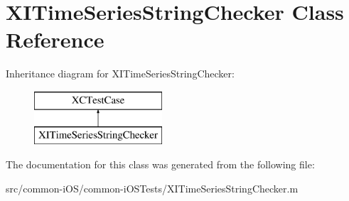 \hypertarget{interface_x_i_time_series_string_checker}{}\section{X\+I\+Time\+Series\+String\+Checker Class Reference}
\label{interface_x_i_time_series_string_checker}
Inheritance diagram for X\+I\+Time\+Series\+String\+Checker\+:\begin{figure}[H]
\begin{center}
\leavevmode
\includegraphics[height=2.000000cm]{interface_x_i_time_series_string_checker}
\end{center}
\end{figure}


The documentation for this class was generated from the following file\+:\begin{DoxyCompactItemize}
\item 
src/common-\/i\+O\+S/common-\/i\+O\+S\+Tests/X\+I\+Time\+Series\+String\+Checker.\+m\end{DoxyCompactItemize}
